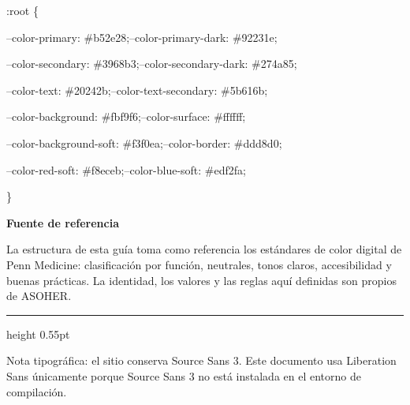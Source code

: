 \documentclass[10pt]{article}
\begin{document}
\begin{tcolorbox}[colback=asohSecondaryDark, colframe=asohSecondaryDark, boxrule=0pt,
  sharp corners, left=7mm, right=7mm, top=5mm, bottom=5mm]
  {\ttfamily\scriptsize\color{white}
  :root \{\par
  \hspace*{5mm}--color-primary: \#b52e28;\quad --color-primary-dark: \#92231e;\par
  \hspace*{5mm}--color-secondary: \#3968b3;\quad --color-secondary-dark: \#274a85;\par
  \hspace*{5mm}--color-text: \#20242b;\quad --color-text-secondary: \#5b616b;\par
  \hspace*{5mm}--color-background: \#fbf9f6;\quad --color-surface: \#ffffff;\par
  \hspace*{5mm}--color-background-soft: \#f3f0ea;\quad --color-border: \#ddd8d0;\par
  \hspace*{5mm}--color-red-soft: \#f8eceb;\quad --color-blue-soft: \#edf2fa;\par
  \}}
\end{tcolorbox}

\vspace{8pt}
\begin{tcolorbox}[colback=asohSurface, colframe=asohBorderWarm, boxrule=0.45pt,
  sharp corners, left=6mm, right=6mm, top=4mm, bottom=4mm]
  {\small\bfseries\color{asohSecondaryDark}Fuente de referencia}\par\vspace{2pt}
  {\scriptsize\color{asohTextSecondary}
  La estructura de esta guía toma como referencia los estándares de color digital de Penn Medicine: clasificación por función, neutrales, tonos claros, accesibilidad y buenas prácticas. La identidad, los valores y las reglas aquí definidas son propios de ASOHER.}
\end{tcolorbox}

\vfill
{\color{asohBorderWarm}\hrule height 0.55pt}\vspace{5pt}
{\footnotesize\color{asohInkWarm}
Nota tipográfica: el sitio conserva Source Sans 3. Este documento usa Liberation Sans únicamente porque Source Sans 3 no está instalada en el entorno de compilación.}
\end{document}
